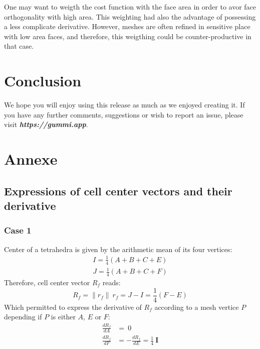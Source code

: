 \documentclass[11pt]{article}
\begin{document}
One may want to weigth the cost function with the face area in order to avor face orthogonality with high area. 
This weighting had also the advantage of possessing a less complicate derivative. 
However, meshes are often refined in sensitive place with low area faces, and therefore, this weigthing could be counter-productive in that case.

\section{Conclusion}

We hope you will enjoy using this release as much as we enjoyed creating it. If you have any further comments, suggestions or wish to report an issue, please visit \emph{\textbf{https://gummi.app}}. 




\section{Annexe}

\subsection{Expressions of cell center vectors and their derivative}
\subsubsection{Case 1}

Center of a tetrahedra is given by the arithmetic mean of its four vertices:
\begin{subequations}
\begin{gather}
I = \frac{1}{4} (A + B + C + E) \\
J = \frac{1}{4} (A + B + C + F)
\end{gather}
\end{subequations} 
Therefore, cell center vector $R_f$ reads:
\begin{equation}
R_f = \| r_f \|\ r_f = J-I = \frac{1}{4} (F - E)
\end{equation}
Which permitted to express the derivative of $R_f$ according to a mesh vertice $P$ depending if $P$ is either $A$, $E$ or $F$:
\begin{subequations}
\begin{align}
\frac{d R_f}{d A} &= \ 0 \\
\frac{d R_f}{d F} &= - \frac{d R_f}{d E} = \frac{1}{4}\ \boldsymbol{I}
\end{align}
\end{subequations} 
\end{document}
